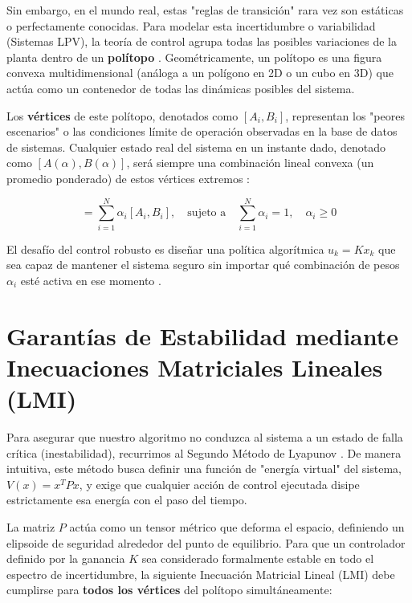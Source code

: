 \documentclass[12pt,twoside]{report}
\begin{document}
Sin embargo, en el mundo real, estas "reglas de transición" rara vez son estáticas o perfectamente conocidas. Para modelar esta incertidumbre o variabilidad (Sistemas LPV), la teoría de control agrupa todas las posibles variaciones de la planta dentro de un \textbf{polítopo} \cite{boyd1994}. Geométricamente, un polítopo es una figura convexa multidimensional (análoga a un polígono en 2D o un cubo en 3D) que actúa como un contenedor de todas las dinámicas posibles del sistema. 

Los \textbf{vértices} de este polítopo, denotados como $[A_i, B_i]$, representan los "peores escenarios" o las condiciones límite de operación observadas en la base de datos de sistemas. Cualquier estado real del sistema en un instante dado, denotado como $[A(\alpha), B(\alpha)]$, será siempre una combinación lineal convexa (un promedio ponderado) de estos vértices extremos \cite{boyd1994}:

\begin{equation}
    [A(\alpha), B(\alpha)] = \sum_{i=1}^{N} \alpha_i [A_i, B_i], \quad \text{sujeto a} \quad \sum_{i=1}^{N} \alpha_i = 1, \quad \alpha_i \ge 0
\end{equation}

El desafío del control robusto es diseñar una política algorítmica $u_k = K x_k$ que sea capaz de mantener el sistema seguro sin importar qué combinación de pesos $\alpha_i$ esté activa en ese momento \cite{zhou1996}.

\section{Garantías de Estabilidad mediante Inecuaciones Matriciales Lineales (LMI)}

Para asegurar que nuestro algoritmo no conduzca al sistema a un estado de falla crítica (inestabilidad), recurrimos al Segundo Método de Lyapunov \cite{khalil2002}. De manera intuitiva, este método busca definir una función de "energía virtual" del sistema, $V(x) = x^T P x$, y exige que cualquier acción de control ejecutada disipe estrictamente esa energía con el paso del tiempo.

La matriz $P$ actúa como un tensor métrico que deforma el espacio, definiendo un elipsoide de seguridad alrededor del punto de equilibrio. Para que un controlador definido por la ganancia $K$ sea considerado formalmente estable en todo el espectro de incertidumbre, la siguiente Inecuación Matricial Lineal (LMI) debe cumplirse para \textbf{todos los vértices} del polítopo simultáneamente:
\end{document}
